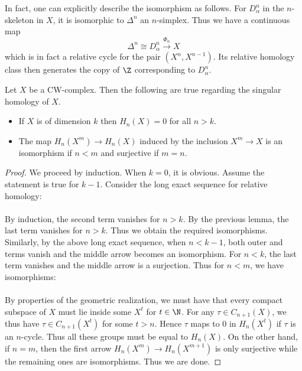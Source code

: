 \documentclass[a4paper]{article}
\begin{document}
In fact, one can explicitly describe the isomorphism as follows. For $D_\alpha^n$ in the $n$-skeleton in $X$, it is isomorphic to $\Delta^n$ an $n$-simplex. Thus we have a continuous map $$\Delta^n\cong D_\alpha^n\overset{\Phi_\alpha}{\longrightarrow}X$$ which is in fact a relative cycle for the pair $(X^n,X^{n-1})$. Its relative homology class then generates the copy of $\Z$ corresponding to $D_\alpha^n$. 

\begin{lmm}{}{} Let $X$ be a CW-complex. Then the following are true regarding the singular homology of $X$. 
\begin{itemize}
\item If $X$ is of dimension $k$ then $H_n(X)=0$ for all $n>k$. 
\item The map $H_n(X^m)\to H_n(X)$ induced by the inclusion $X^m\to X$ is an isomorphism if $n<m$ and surjective if $m=n$. 
\end{itemize} 
\begin{proof}
We proceed by induction. When $k=0$, it is obvious. Assume the statement is true for $k-1$. Consider the long exact sequence for relative homology: \\
\\
By induction, the second term vanishes for $n>k$. By the previous lemma, the last term vanishes for $n>k$. Thus we obtain the required isomorphisms. \\

Similarly, by the above long exact sequence, when $n<k-1$, both outer and terms vanish and the middle arrow becomes an isomorphism. For $n<k$, the last term vanishes and the middle arrow is a surjection. Thus for $n<m$, we have isomorphisms: \\
\\
By properties of the geometric realization, we must have that every compact subspace of $X$ must lie inside some $X^t$ for $t\in\N$. For any $\tau\in C_{n+1}(X)$, we thus have $\tau\in C_{n+1}(X^t)$ for some $t>n$. Hence $\tau$ maps to $0$ in $H_n(X^t)$ if $\tau$ is an $n$-cycle. Thus all these groups must be equal to $H_n(X)$. On the other hand, if $n=m$, then the first arrow $H_n(X^m)\to H_n(X^{m+1})$ is only surjective while the remaining ones are isomorphisms. Thus we are done. 
\end{proof}
\end{lmm}
\end{document}

